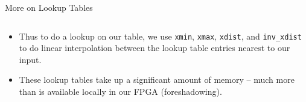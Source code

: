 \documentclass[aspectratio=169,xcolor=dvipsnames]{beamer}
\begin{document}
\begin{frame}{More on Lookup Tables}
\begin{columns}[t]
\begin{adjustbox}{width=\textwidth}

        \end{adjustbox}
    \end{columns}

    \begin{itemize}
        \item Thus to do a lookup on our table, we use \texttt{xmin}, \texttt{xmax}, \texttt{xdist}, and \texttt{inv\_xdist} to do linear interpolation between the lookup table entries nearest to our input.
        \item These lookup tables take up a significant amount of memory -- much more than is available locally in our FPGA (foreshadowing).
    \end{itemize}


\end{frame}





\end{document}
